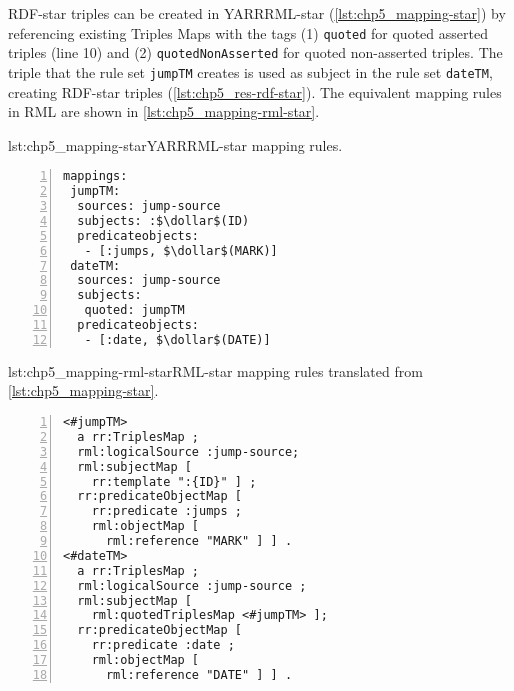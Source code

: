 RDF-star triples can be created in YARRRML-star (\cref{lst:chp5_mapping-star}) by referencing existing Triples Maps with the tags (1) \texttt{quoted} for quoted asserted triples (line 10) and (2) \texttt{quotedNonAss\-erted} for quoted non-asserted triples.  
The triple that the rule set \texttt{jumpTM} creates is used as subject in the rule set \texttt{dateTM}, creating RDF-star triples (\cref{lst:chp5_res-rdf-star}). The equivalent mapping rules in RML are shown in \cref{lst:chp5_mapping-rml-star}.  

\begin{minipage}{\linewidth}
\centering
\begin{captionedlisting}{lst:chp5_mapping-star}{YARRRML-star mapping rules. }
\centering
\begin{multicols}{2}
{\begin{lstlisting}[numbers=left,basicstyle=\ttfamily\small,columns=flexible,]
mappings:
 jumpTM:
  sources: jump-source
  subjects: :$\dollar$(ID)
  predicateobjects:
   - [:jumps, $\dollar$(MARK)]
 dateTM:
  sources: jump-source
  subjects:
   quoted: jumpTM
  predicateobjects:
   - [:date, $\dollar$(DATE)]
\end{lstlisting}}

\end{multicols}
\end{captionedlisting}
\end{minipage}

\begin{minipage}{\linewidth}
\centering
\begin{captionedlisting}{lst:chp5_mapping-rml-star}{RML-star mapping rules translated from \cref{lst:chp5_mapping-star}. }
\centering
\begin{multicols}{2}
{\begin{lstlisting}[numbers=left,basicstyle=\ttfamily\small,columns=flexible,]
<#jumpTM> 
  a rr:TriplesMap ;
  rml:logicalSource :jump-source;
  rml:subjectMap [ 
    rr:template ":{ID}" ] ;
  rr:predicateObjectMap [ 
    rr:predicate :jumps ;
    rml:objectMap [
      rml:reference "MARK" ] ] .
<#dateTM> 
  a rr:TriplesMap ;
  rml:logicalSource :jump-source ;
  rml:subjectMap [ 
    rml:quotedTriplesMap <#jumpTM> ];
  rr:predicateObjectMap [ 
    rr:predicate :date ;
    rml:objectMap [
      rml:reference "DATE" ] ] .
\end{lstlisting}}

\end{multicols}
\end{captionedlisting}
\end{minipage}





